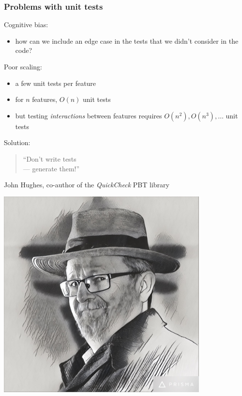 \documentclass{beamer}
\begin{document}
\begin{frame}[fragile]
  \frametitle{Problems with unit tests}

  Cognitive bias:
  \begin{itemize}
  \item how can we include an edge case in the tests
    that we didn't consider in the code?
  \end{itemize}
  \medskip
  
  Poor scaling:
  \begin{itemize}
  \item a few unit tests per feature
  \item for $n$ features, $O(n)$ unit tests
  \item but testing \emph{interactions} between features requires $O(n^2),
    O(n^3), \ldots$ unit tests
  \end{itemize}
  \pause
  \bigskip
  

    \begin{minipage}{0.6\textwidth}
      Solution:
      \medskip
      
      \begin{quote}
        ``Don't write tests \\
        --- generate them!''
      \end{quote}
      John Hughes, co-author of the \emph{QuickCheck}
      PBT library
    \end{minipage}
    \begin{minipage}{0.3\textwidth}
      \hfill
      \includegraphics[width=0.8\textwidth]{images/john-hughes}
    \end{minipage}
  
\end{frame}
\end{document}
